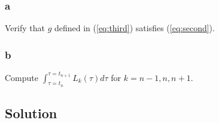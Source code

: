 \documentclass[11pt]{report}
\theoremstyle{definition}
\begin{document}
\subsubsection*{a}
Verify that $g$ defined in (\ref{eq:third}) satisfies (\ref{eq:second}).
\subsubsection*{b}
Compute $\int_{\tau=t_n}^{\tau=t_{n+1}}L_{k}(\tau)d\tau$ for $k=n-1,n,n+1$.

\subsection*{Solution}


\end{document}
